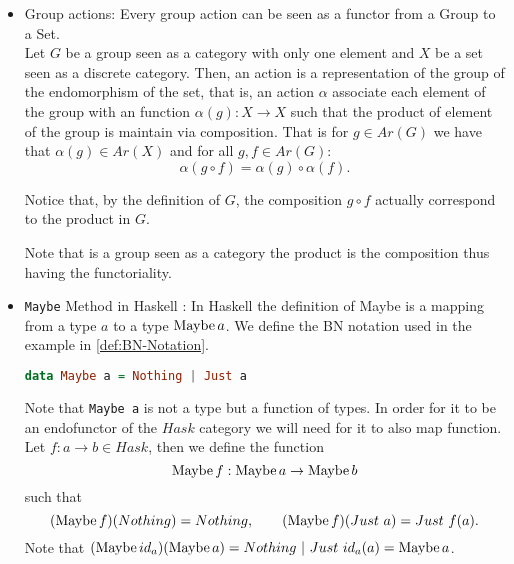 \begin{example}
\begin{itemize}


  \item Group actions:\label{group-action} Every group action can be seen as a functor from a Group to a Set.\\
    
    Let $G$ be a group seen as a category with only one element and $X$ be a set seen as a discrete category. Then, an action is a representation of the group of the endomorphism of the set, that is, an action $\alpha$ associate each element of the group with an function $\alpha(g):X\to X$ such that the product of element of the group is maintain via composition. That is for $g\in Ar(G)$ we have that $\alpha(g) \in Ar(X)$  and for all $ g,f\in Ar(G):$
    $$\alpha(g\circ f) = \alpha(g) \circ \alpha(f).$$

    Notice that, by the definition of $G$, the composition $g\circ f$ actually correspond to the product in $G$.
    
    Note that is a group seen as a category the product is the composition thus having the functoriality.\\
    
  \item \texttt{Maybe} Method in Haskell \cite[Section 7.1]{milewski2018category}: In Haskell the definition of Maybe is a mapping from a type $a$ to a type $\operatorname{Maybe}  a$. We define the BN notation used in the example in \ref{def:BN-Notation}.

    \begin{center}
      \begin{lstlisting}[language=Haskell,caption={Declaration of Maybe},captionpos=b]
        data Maybe a = Nothing | Just a
      \end{lstlisting}
    \end{center}
    
    Note that \texttt{Maybe a} is not a type but a function of types. In order for it to be an endofunctor of the $Hask$ category we will need for it to also map function. Let $f: a \to b\in Hask$, then we define the function
    $$\operatorname{Maybe}  f: \operatorname{Maybe} a \to \operatorname{Maybe} b$$
    such that
    $$(\operatorname{Maybe}  f) (Nothing) = Nothing, \qquad (\operatorname{Maybe} f) (Just\  a) = Just\  f(a).$$
    Note that $(\operatorname{Maybe} id_a) (\operatorname{Maybe} a) = Nothing\  |\  Just\  id_a(a) =  \operatorname{Maybe} a$.
  \end{itemize}
\end{example}


